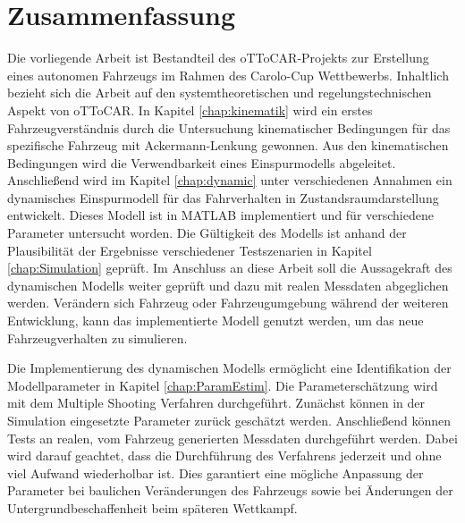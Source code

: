 \chapter{Zusammenfassung} \label{chap:summary}

Die vorliegende Arbeit ist Bestandteil des oTToCAR-Projekts zur Erstellung eines autonomen Fahrzeugs im Rahmen des Carolo-Cup Wettbewerbs. Inhaltlich bezieht sich die Arbeit auf den systemtheoretischen und regelungstechnischen Aspekt von oTToCAR.\newline  
In Kapitel \ref{chap:kinematik} wird ein erstes Fahrzeugverständnis durch die Untersuchung kinematischer Bedingungen für das spezifische Fahrzeug mit Ackermann-Lenkung gewonnen. Aus den kinematischen Bedingungen wird die Verwendbarkeit eines Einspurmodells abgeleitet.
Anschließend wird im Kapitel \ref{chap:dynamic} unter verschiedenen Annahmen ein dynamisches Einspurmodell für das Fahrverhalten in Zustandsraumdarstellung entwickelt.
Dieses Modell ist in MATLAB implementiert und für verschiedene Parameter untersucht worden. Die Gültigkeit des Modells ist anhand der Plausibilität der Ergebnisse verschiedener Testszenarien in Kapitel \ref{chap:Simulation} geprüft.
Im Anschluss an diese Arbeit soll die Aussagekraft des dynamischen Modells weiter geprüft und dazu mit realen Messdaten abgeglichen werden.
Verändern sich Fahrzeug oder Fahrzeugumgebung während der weiteren Entwicklung, kann das implementierte Modell genutzt werden, um das neue Fahrzeugverhalten zu simulieren.

Die Implementierung des dynamischen Modells ermöglicht eine Identifikation der Modellparameter in Kapitel \ref{chap:ParamEstim}.
Die Parameterschätzung wird mit dem Multiple Shooting Verfahren durchgeführt.
Zunächst können in der Simulation eingesetzte Parameter zurück geschätzt werden. Anschließend können Tests an realen, vom Fahrzeug generierten Messdaten durchgeführt werden.
Dabei wird darauf geachtet, dass die Durchführung des Verfahrens jederzeit und ohne viel Aufwand wiederholbar ist. Dies garantiert eine mögliche Anpassung der Parameter bei baulichen Veränderungen des Fahrzeugs sowie bei Änderungen der  Untergrundbeschaffenheit beim späteren Wettkampf. 

